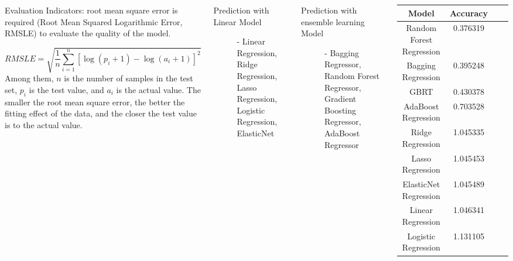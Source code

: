 \documentclass{tikzposter} %
\begin{document}
\begin{columns}
{
  \begin{description}
    \item Evaluation Indicators: root mean square error is required (Root Mean Squared Logarithmic Error, RMSLE) to evaluate the quality of the model. 
    \smallskip
    
    {$$ RMSLE = \sqrt{\frac{1}{n} \sum_{i=1}^n [\log(p_i + 1) - \log(a_i + 1)]^2} $$}
    Among them, $n$ is the number of samples in the test set, $p_i$ is the test value, and $a_i$ is the actual value. The smaller the root mean square error, the better the fitting effect of the data, and the closer the test value is to the actual value.
\end{description}
\vspace{.5cm}
\begin{description}
  	\item[Prediction with Linear Model] - Linear Regression, Ridge Regression, Lasso Regression, Logistic Regression, ElasticNet
\end{description}
\vspace{.5cm}

\begin{description}
    \item
    [Prediction with ensemble learning Model] - Bagging Regressor, Random Forest Regressor, Gradient Boosting Regressor, AdaBoost Regressor
\end{description}
\vspace{.5cm}
\centering
\begin{tabular}{ c | c | c | c }
  \toprule
    Model     & Accuracy      \\
  \midrule
  Random Forest Regression        & 0.376319   \\
  Bagging Regression              & 0.395248    \\
  GBRT                            & 0.430378   \\
  AdaBoost Regression             & 0.703528   \\ 
  Ridge Regression                & 1.045335   \\
  Lasso Regression                & 1.045453 \\
  ElasticNet Regression           & 1.045489 \\
  Linear Regression               & 1.046341 \\
  Logistic Regression             & 1.131105 \\
  \bottomrule
  \end{tabular}

}
\end{columns}
\end{document}
